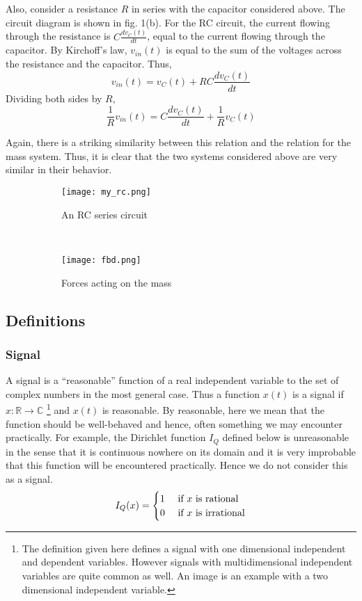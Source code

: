     Also, consider a resistance $R$ in series with the capacitor considered above. The circuit diagram is shown in fig. 1(b). For the RC circuit, the current flowing through the resistance is $C\frac{dv_{C}(t)}{dt}$, equal to the current flowing through the capacitor. By Kirchoff's law, $v_{in}(t)$ is equal to the sum of the voltages across the resistance and the capacitor. Thus,
    \[
    v_{in}(t) = v_{C}(t) + RC\frac{dv_{C}(t)}{dt}
    \]
    Dividing both sides by $R$,
    \[
    \frac{1}{R}v_{in}(t) = C\frac{dv_{C}(t)}{dt} + \frac{1}{R}v_{C}(t)
    \]

    Again, there is a striking similarity between this relation and the relation for the mass system. Thus, it is clear that the two systems considered above are very similar in their behavior.

    \begin{figure}[H]
        \centering
        \begin{subfigure}[b]{0.4\textwidth}
            \texttt{[image: my\_rc.png]}
            \caption{An RC series circuit}
            \end{subfigure}
            \quad
    	~
            \begin{subfigure}[b]{0.5\textwidth}
                \texttt{[image: fbd.png]}
                    \caption{Forces acting on the mass}
            \end{subfigure}
            \caption{}
    \end{figure}
\subsection{Definitions}
\subsubsection{Signal}
A signal is a ``reasonable'' function of a real independent variable to the set of complex numbers in the most general case. Thus a function $x(t)$ is a signal if $x:\mathbb{R} \xrightarrow{} \mathbb{C}$ \footnote{The definition given here defines a signal with one dimensional independent and dependent variables. However signals with multidimensional independent variables are quite common as well. An image is an example with a two dimensional independent variable.} and $x(t)$ is reasonable. By reasonable, here we mean that the function should be well-behaved and hence, often something we may encounter practically. For example, the Dirichlet function $I_{Q}$ defined below is unreasonable in the sense that it is continuous nowhere on its domain and it is very improbable that this function will be encountered practically. Hence we do not consider this as a signal.
\[
I_{Q}(x) =
  \begin{cases}
      \hfill 1 \hfill & \text{ if $x$ is rational} \\
      \hfill 0 \hfill & \text{ if $x$ is irrational} \\
  \end{cases}
\]

